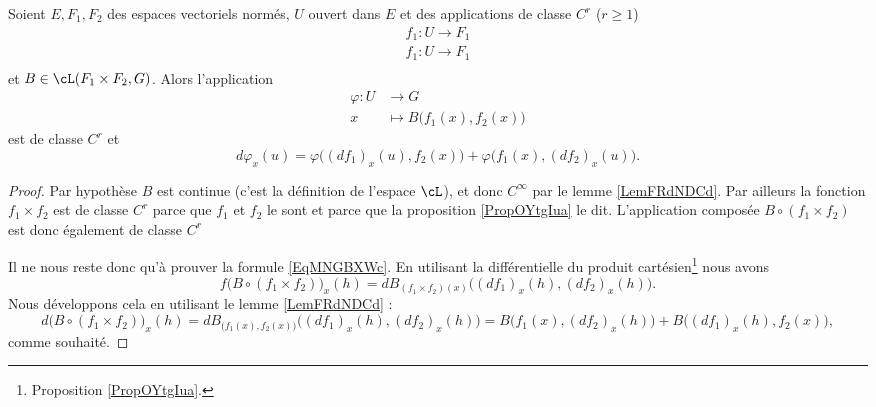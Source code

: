 \begin{proposition}
    Soient \( E,F_1,F_2\) des espaces vectoriels normés, \( U\) ouvert dans \( E\) et des applications de classe \( C^r\) (\( r\geq 1\))
    \begin{subequations}
        \begin{align}
            f_1\colon U\to F_1\\
            f_1\colon U\to F_1\\
        \end{align}
    \end{subequations}
    et \( B\in\cL(F_1\times F_2,G)\). Alors l'application
    \begin{equation}
        \begin{aligned}
            \varphi\colon U&\to G \\
            x&\mapsto B\big( f_1(x),f_2(x) \big) 
        \end{aligned}
    \end{equation}
    est de classe \( C^r\) et
    \begin{equation}    \label{EqMNGBXWc}
        d\varphi_x(u)=\varphi\big( (df_1)_x(u),f_2(x) \big)+\varphi\big( f_1(x),(df_2)_x(u) \big).
    \end{equation}
\end{proposition}

\begin{proof}
    Par hypothèse \( B\) est continue (c'est la définition de l'espace \( \cL\)), et donc \(  C^{\infty}\) par le lemme \ref{LemFRdNDCd}. Par ailleurs la fonction \( f_1\times f_2\) est de classe \( C^r\) parce que \( f_1\) et \( f_2\) le sont et parce que la proposition \ref{PropOYtgIua} le dit. L'application composée \( B\circ(f_1\times f_2)\) est donc également de classe \( C^r\)

    Il ne nous reste donc qu'à prouver la formule \ref{EqMNGBXWc}. En utilisant la différentielle du produit cartésien\footnote{Proposition \ref{PropOYtgIua}.} nous avons
    \begin{equation}
        f\big( B\circ(f_1\times f_2) \big)_x(h)=dB_{(f_1\times f_2)(x)}\big( (df_1)_x(h),(df_2)_x(h) \big).
    \end{equation}
    Nous développons cela en utilisant le lemme \ref{LemFRdNDCd} :
    \begin{equation}
        d\big( B\circ(f_1\times f_2) \big)_x(h)=dB_{\big( f_1(x),f_2(x) \big)}\big( (df_1)_x(h),(df_2)_x(h) \big)=B\big( f_1(x),(df_2)_x(h) \big)+B\big( (df_1)_x(h),f_2(x) \big),
    \end{equation}
    comme souhaité.
\end{proof}

